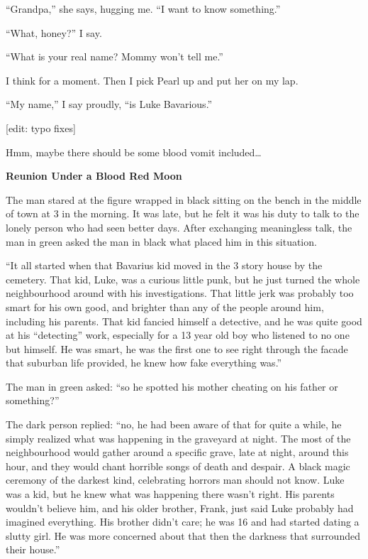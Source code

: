``Grandpa,'' she says, hugging me. ``I want to know
something.''



``What, honey?'' I say.



``What is your real name? Mommy won't tell
me.''



I think for a moment. Then I pick Pearl up and put her on my
lap.



``My name,'' I say proudly, ``is Luke
Bavarious.''



[edit: typo fixes] 
 





Hmm, maybe there should be some blood vomit included{\ldots}



{\bf Reunion Under a Blood Red Moon}

The man stared at the figure wrapped in black sitting on the bench
in the middle of town at 3 in the morning. It was late, but he felt
it was his duty to talk to the lonely person who had seen better
days. After exchanging meaningless talk, the man in green asked the
man in black what placed him in this situation.

``It all started when that Bavarius kid moved in the 3 story
house by the cemetery. That kid, Luke, was a curious little punk,
but he just turned the whole neighbourhood around with his
investigations. That little jerk was probably too smart for his own
good, and brighter than any of the people around him, including his
parents. That kid fancied himself a detective, and he was quite
good at his ``detecting'' work, especially for a 13 year
old boy who listened to no one but himself. He was smart, he was
the first one to see right through the facade that suburban life
provided, he knew how fake everything was.''

The man in green asked: ``so he spotted his mother cheating on
his father or something?''

The dark person replied: ``no, he had been aware of that for
quite a while, he simply realized what was happening in the
graveyard at night. The most of the neighbourhood would gather
around a specific grave, late at night, around this hour, and they
would chant horrible songs of death and despair. A black magic
ceremony of the darkest kind, celebrating horrors man should not
know. Luke was a kid, but he knew what was happening there
wasn't right. His parents wouldn't believe him, and his
older brother, Frank, just said Luke probably had imagined
everything. His brother didn't care; he was 16 and had
started dating a slutty girl. He was more concerned about that then
the darkness that surrounded their house.''

